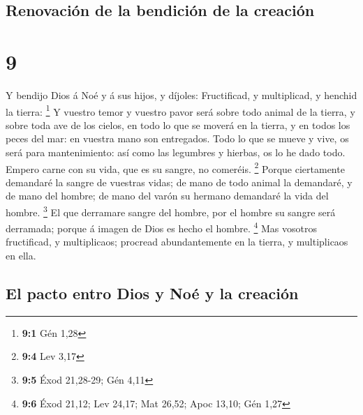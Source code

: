 \hypertarget{renovaciuxf3n-de-la-bendiciuxf3n-de-la-creaciuxf3n}{%
\subsection{Renovación de la bendición de la
creación}\label{renovaciuxf3n-de-la-bendiciuxf3n-de-la-creaciuxf3n}}

\hypertarget{section-8}{%
\section{9}\label{section-8}}

 Y bendijo Dios á Noé y á sus hijos, y díjoles: Fructificad,
y multiplicad, y henchid la tierra: \footnote{\textbf{9:1} Gén 1,28}
 Y vuestro temor y vuestro pavor será sobre todo animal de
la tierra, y sobre toda ave de los cielos, en todo lo que se moverá en
la tierra, y en todos los peces del mar: en vuestra mano son entregados.
 Todo lo que se mueve y vive, os será para mantenimiento:
así como las legumbres y hierbas, os lo he dado todo. 
Empero carne con su vida, que es su sangre, no comeréis. \footnote{\textbf{9:4}
  Lev 3,17}  Porque ciertamente demandaré la sangre de
vuestras vidas; de mano de todo animal la demandaré, y de mano del
hombre; de mano del varón su hermano demandaré la vida del hombre.
\footnote{\textbf{9:5} Éxod 21,28-29; Gén 4,11}  El que
derramare sangre del hombre, por el hombre su sangre será derramada;
porque á imagen de Dios es hecho el hombre. \footnote{\textbf{9:6} Éxod
  21,12; Lev 24,17; Mat 26,52; Apoc 13,10; Gén 1,27}  Mas
vosotros fructificad, y multiplicaos; procread abundantemente en la
tierra, y multiplicaos en ella.

\hypertarget{el-pacto-entro-dios-y-nouxe9-y-la-creaciuxf3n}{%
\subsection{El pacto entro Dios y Noé y la
creación}\label{el-pacto-entro-dios-y-nouxe9-y-la-creaciuxf3n}}

